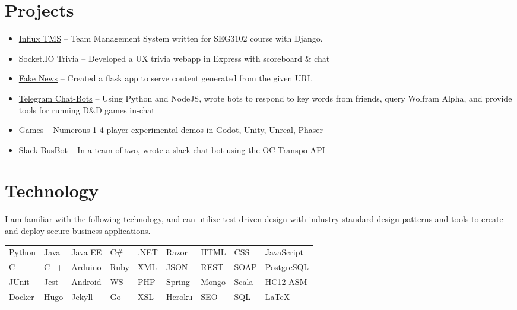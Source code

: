 \documentclass[]{rcf_cv}
\begin{document}
	\section{Projects}
		\begin{itemize}
			\setlength\itemsep{-0.4em}
			\renewcommand\labelitemi{--}
			
			\item \href{https://github.com/RyanFleck/Influx}{Influx TMS} -- Team Management System written for SEG3102 course with Django.
			
			\item Socket.IO Trivia -- Developed a UX trivia webapp in Express with scoreboard \& chat
			
			\item \href{https://github.com/RyanFleck/Fake-News}{Fake News} -- Created a flask app to serve content generated from the given URL
			
			\item \href{https://github.com/RyanFleck/Telegram-Dungeon}{Telegram Chat-Bots} -- Using Python and NodeJS, wrote bots to respond to key words from friends, query Wolfram Alpha, and provide tools for running D\&D games in-chat
			
			\item Games -- Numerous 1-4 player experimental demos in Godot, Unity, Unreal, Phaser
			
			\item \href{https://github.com/morch028/BusBot}{Slack BusBot} -- In a team of two, wrote a slack chat-bot using the OC-Transpo API
			

			
		\end{itemize}

	\section{Technology}
	
		I am familiar with the following technology, and can utilize test-driven design with industry standard design patterns and tools to create and deploy secure business applications.\\
	
	\begin{tabular}{l l l l l l l l l}
		Python & Java & Java EE & C\# & .NET & Razor & HTML & CSS & JavaScript \\
		
		C & C++ & Arduino & Ruby & XML & JSON & REST & SOAP & PostgreSQL \\
		
		JUnit & Jest & Android & WS & PHP & Spring & Mongo & Scala &  HC12 ASM \\
		
		Docker & Hugo & Jekyll & Go & XSL & Heroku & SEO & SQL & \LaTeX
		
	\end{tabular}
	
\end{document}

